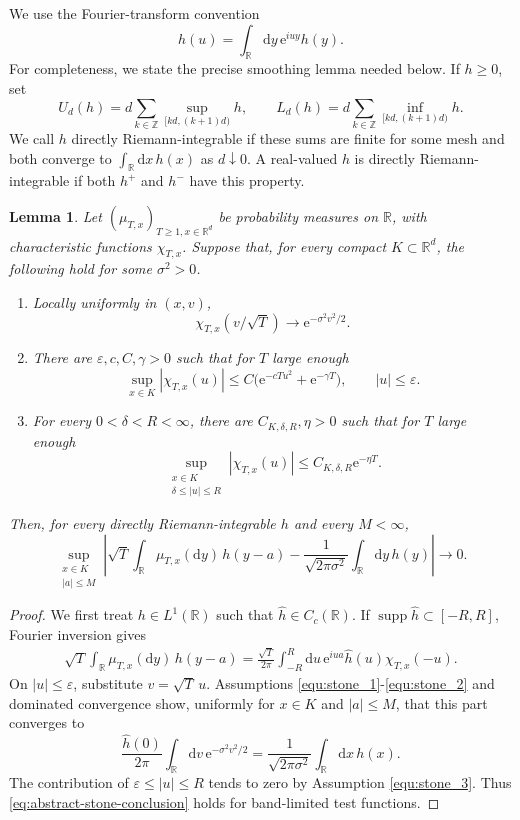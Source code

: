 \documentclass[11pt,reqno]{amsart}
\newtheorem{lemma}[theorem]{Lemma}
\theoremstyle{definition}
\numberwithin{equation}{section}
\newcommand{\<}{\langle}
\renewcommand{\>}{\rangle}
\def\R{{\mathbb R}}
\def\de{{\rm d}}
\def\de{{\mathrm {d}}}
\begin{document}
\begin{appendix}
We use the Fourier-transform convention
\[
 \widehat h(u)=\int_\R \de y \, \mathrm e^{iuy}h(y).
\]
For completeness, we state the precise smoothing lemma needed below.  If
$h\geq0$, set
\[
 U_d(h)=d\sum_{k\in\mathbb Z}\sup_{[kd,(k+1)d)}h,
 \qquad
 L_d(h)=d\sum_{k\in\mathbb Z}\inf_{[kd,(k+1)d)}h.
\]
We call $h$ directly Riemann-integrable if these sums are finite for some
mesh and both converge to $\int_\R \de x \, h(x)$ as $d\downarrow0$.  A real-valued $h$
is directly Riemann-integrable if both $h^+$ and $h^-$ have this property.
\begin{lemma}
\label{lem:stone-smoothing}
Let $(\mu_{T,x})_{T\geq1,x\in\mathbb R^d}$ be probability measures on $\mathbb R$, with
characteristic functions $\chi_{T,x}$.  Suppose that, for every compact
$K\subset\mathbb R^d$, the following hold for some $\sigma^2>0$.
\begin{enumerate}
 \item Locally uniformly in $(x,v)$, \label{equ:stone_1}
       \[
       \chi_{T,x}(v/\sqrt T)\longrightarrow \mathrm e^{-\sigma^2v^2/2}.
       \]
 \item There are $\varepsilon,c,C,\gamma>0$ such that for $T$ large enough
       \[
       \sup_{x\in K}|\chi_{T,x}(u)|
       \leq C\bigl(\mathrm e^{-cTu^2}+ \mathrm e^{-\gamma T}\bigr),
       \qquad |u|\leq\varepsilon.
       \]\label{equ:stone_2}
 \item For every $0<\delta<R<\infty$, there are $C_{K,\delta,R},\eta>0$
       such that for $T$ large enough
       \[
       \sup_{\substack{x\in K\\\delta\leq|u|\leq R}}
       |\chi_{T,x}(u)|
       \leq C_{K,\delta,R}\mathrm e^{-\eta T}.
       \]\label{equ:stone_3}
\end{enumerate}
Then, for every directly Riemann-integrable $h$ and every $M<\infty$,
\begin{equation}
 \sup_{\substack{x\in K\\|a|\leq M}}
 \left|
  \sqrt T\int_\R \mu_{T,x}(\de y) \, h(y-a)
  -\frac1{\sqrt{2\pi\sigma^2}}
   \int_\R \de y \, h(y)
 \right|
 \longrightarrow0.
 \label{eq:abstract-stone-conclusion}
\end{equation}
\end{lemma}

\begin{proof}
We first treat $h\in L^1(\R)$ such that
$\widehat h\in C_c(\R)$.  If
$\operatorname{supp}\widehat h\subset[-R,R]$, Fourier inversion gives
\begin{align*}
 \sqrt T\int_\R \mu_{T,x}(\de y) \, h(y-a)
 =
 \frac{\sqrt T}{2\pi}
 \int_{-R}^R \de u \, \mathrm e^{iua}\widehat h(u)\chi_{T,x}(-u).
\end{align*}
On $|u|\leq\varepsilon$, substitute $v=\sqrt T\,u$.  Assumptions \eqref{equ:stone_1}-\eqref{equ:stone_2}
and dominated convergence show, uniformly for $x\in K$ and $|a|\leq M$,
that this part converges to
\[
 \frac{\widehat h(0)}{2\pi}
 \int_\R \de v \, \mathrm e^{-\sigma^2v^2/2}
 =\frac1{\sqrt{2\pi\sigma^2}}\int_\R \de x \, h(x).
\]
The contribution of $\varepsilon\leq|u|\leq R$ tends to zero by Assumption \eqref{equ:stone_3}.
Thus \eqref{eq:abstract-stone-conclusion} holds for band-limited test
functions.


\end{proof}
\end{appendix}
\end{document}
